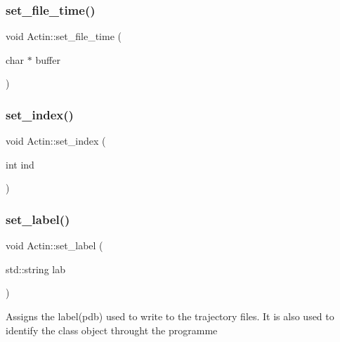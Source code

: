 \mbox{\label{classActin_ae38649ca8146edc88562229715a1a4b6}} 
\subsubsection{\texorpdfstring{set\_file\_time()}{set\_file\_time()}}
{\footnotesize\ttfamily void Actin\+::set\+\_\+file\+\_\+time (\begin{DoxyParamCaption}\item[{char $\ast$}]{buffer }\end{DoxyParamCaption})\hspace{0.3cm}{\ttfamily [inline]}}

\mbox{\label{classActin_a507b129521e48ef9aa5b47398e5d1213}} 
\subsubsection{\texorpdfstring{set\_index()}{set\_index()}}
{\footnotesize\ttfamily void Actin\+::set\+\_\+index (\begin{DoxyParamCaption}\item[{int}]{ind }\end{DoxyParamCaption})\hspace{0.3cm}{\ttfamily [inline]}}

\mbox{\label{classActin_a59b0f9aec939cd38eb1bfe5971f6ea0d}} 
\subsubsection{\texorpdfstring{set\_label()}{set\_label()}}
{\footnotesize\ttfamily void Actin\+::set\+\_\+label (\begin{DoxyParamCaption}\item[{std\+::string}]{lab }\end{DoxyParamCaption})\hspace{0.3cm}{\ttfamily [inline]}}

Assigns the label(pdb) used to write to the trajectory files. It is also used to identify the class object throught the programme \mbox{\label{classActin_a93cbd48dc08c5d0f5130a41768b50ef6}} 
